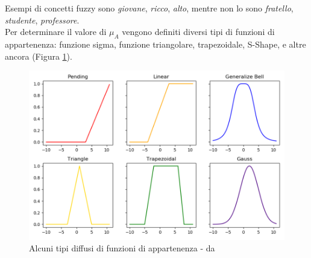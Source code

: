 \documentclass[12pt]{report}
\theoremstyle{definition}
\begin{document}
Esempi di concetti fuzzy sono \textit{giovane}, \textit{ricco}, \textit{alto}, mentre non lo sono \textit{fratello}, \textit{studente}, \textit{professore}.
\\
Per determinare il valore di $\mu_A$ vengono definiti diversi tipi di funzioni di appartenenza: funzione sigma, funzione triangolare, trapezoidale, S-Shape, e altre ancora (Figura \ref{membership_functions}). 
\\
\begin{figure}
    \centering
    \includegraphics[scale = 0.7]{images/membership_functions.png}
    \caption{Alcuni tipi diffusi di funzioni di appartenenza - da \cite{30}}
    \label{membership_functions}
\end{figure}
\end{document}
